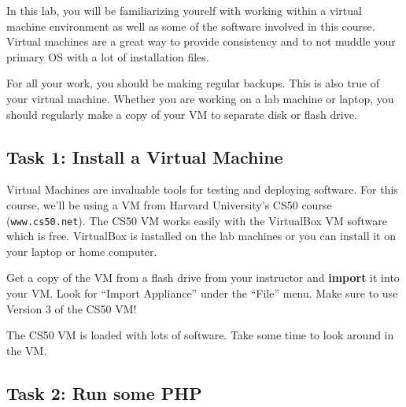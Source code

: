 \documentclass[letterpaper]{article}
\begin{document}
In this lab, you will be
familiarizing yourelf with working within a
virtual machine environment as well as some of the software involved in this course.  Virtual machines are a great way to provide
consistency and to not muddle your primary OS with a lot of installation files.

For all your work, you should be making regular backups.  This is also true of
your virtual machine.  Whether you are working on a lab machine or laptop, you
should regularly make a copy of your VM to separate disk or flash drive.


\subsection*{Task 1: Install a Virtual Machine}

Virtual Machines are invaluable tools for testing and deploying software.  For
this course, we'll be using a VM from Harvard University's CS50 course
(\lstinline{www.cs50.net}).  The CS50 VM works easily with the VirtualBox VM
software which is free.  VirtualBox is installed on the lab machines or you can
install it on your laptop or home computer.

Get a copy of the VM from a flash drive from your instructor and {\bf import}
it into your VM.  Look for ``Import Appliance'' under the ``File'' menu.  Make
sure to use Version 3 of the CS50 VM!

The CS50 VM is loaded with lots of software.  Take some time to look around in
the VM.

\subsection*{Task 2: Run some PHP}
\end{document}
